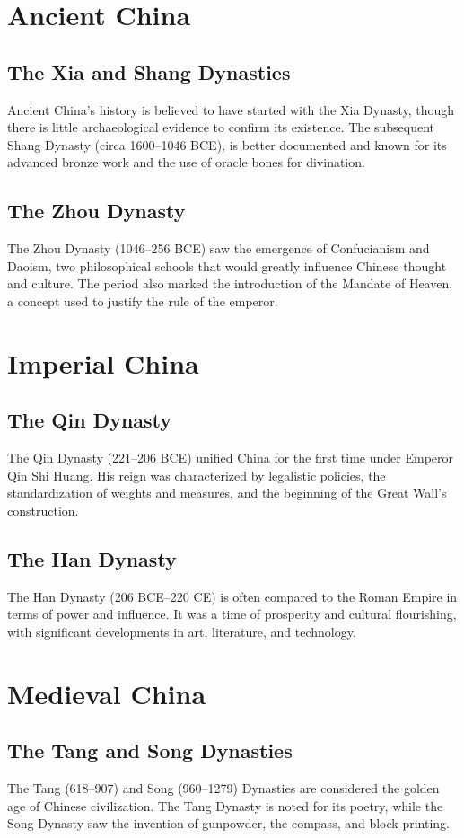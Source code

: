 \documentclass[a4paper,12pt]{book}
\begin{document}
\section{Ancient China}
\subsection{The Xia and Shang Dynasties}
Ancient China’s history is believed to have started with the Xia Dynasty, though there is little archaeological evidence to confirm its existence. The subsequent Shang Dynasty (circa 1600–1046 BCE), is better documented and known for its advanced bronze work and the use of oracle bones for divination.

\subsection{The Zhou Dynasty}
The Zhou Dynasty (1046–256 BCE) saw the emergence of Confucianism and Daoism, two philosophical schools that would greatly influence Chinese thought and culture. The period also marked the introduction of the Mandate of Heaven, a concept used to justify the rule of the emperor.

\section{Imperial China}
\subsection{The Qin Dynasty}
The Qin Dynasty (221–206 BCE) unified China for the first time under Emperor Qin Shi Huang. His reign was characterized by legalistic policies, the standardization of weights and measures, and the beginning of the Great Wall’s construction.

\subsection{The Han Dynasty}
The Han Dynasty (206 BCE–220 CE) is often compared to the Roman Empire in terms of power and influence. It was a time of prosperity and cultural flourishing, with significant developments in art, literature, and technology.

\section{Medieval China}
\subsection{The Tang and Song Dynasties}
The Tang (618–907) and Song (960–1279) Dynasties are considered the golden age of Chinese civilization. The Tang Dynasty is noted for its poetry, while the Song Dynasty saw the invention of gunpowder, the compass, and block printing.
\end{document}
